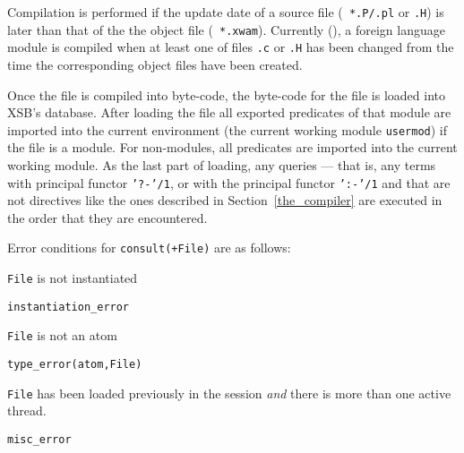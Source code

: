 Compilation is performed if the update date of a source file ({\tt
*.P/.pl} or {\tt *.H}) is later than that of the the object file ({\tt
*.xwam}).
Currently (\version), a foreign language module is compiled when at
least one of files {\tt *.c} or {\tt *.H} has been changed from the
time the corresponding object files have been created.

Once the file is compiled into byte-code, the byte-code for the file
is loaded into XSB's database.  After loading the file all exported
predicates of that module are imported into the current environment
(the current working module {\tt usermod}) if the file is a module.
For non-modules, all predicates are imported into the current working
module.  As the last part of loading, any queries --- that is, any
terms with principal functor {\tt '?-'/1}, or with the principal
functor {\tt ':-'/1} and that are not directives like the ones
described in Section~\ref{the_compiler} are executed in the order that
they are encountered.

Error conditions for {\tt consult(+File)} are as follows: 
\bi
\item 	{\tt File} is not instantiated
\bi
\item 	{\tt instantiation\_error}
\ei
%
\item 	{\tt File} is not an atom
\bi
\item 	{\tt type\_error(atom,File)}
\ei
%
\item {\tt File} has been loaded previously in the session {\em and}
  there is more than one active thread.  \bi
\item 	{\tt misc\_error}
\ei
\ei

